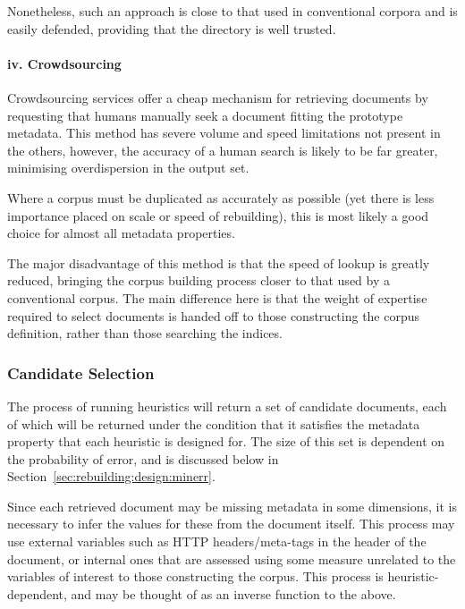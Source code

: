 Nonetheless, such an approach is close to that used in conventional corpora and is easily defended, providing that the directory is well trusted.%

\paragraph{iv. Crowdsourcing}
Crowdsourcing services offer a cheap mechanism for retrieving documents by requesting that humans manually seek a document fitting the prototype metadata.  This method has severe volume and speed limitations not present in the others, however, the accuracy of a human search is likely to be far greater, minimising overdispersion in the output set.

Where a corpus must be duplicated as accurately as possible (yet there is less importance placed on scale or speed of rebuilding), this is most likely a good choice for almost all metadata properties.

The major disadvantage of this method is that the speed of lookup is greatly reduced, bringing the corpus building process closer to that used by a conventional corpus.  The main difference here is that the weight of expertise required to select documents is handed off to those constructing the corpus definition, rather than those searching the indices.







\subsubsection{Candidate Selection}
The process of running heuristics will return a set of candidate documents, each of which will be returned under the condition that it satisfies the metadata property that each heuristic is designed for.  The size of this set is dependent on the probability of error, and is discussed below in Section~\ref{sec:rebuilding:design:minerr}.

Since each retrieved document may be missing metadata in some dimensions, it is necessary to infer the values for these from the document itself.  This process may use external variables such as HTTP headers/meta-tags in the header of the document, or internal ones that are assessed using some measure unrelated to the variables of interest to those constructing the corpus.  This process is heuristic-dependent, and may be thought of as an inverse function to the above.

